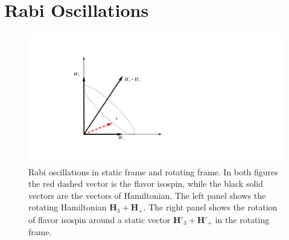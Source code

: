 \documentclass[%
reprint,
 amsmath,amssymb,
 aps,
]{revtex4-1}
\begin{document}

\section{\label{sec:rabi-oscillations}Rabi Oscillations}


\begin{figure}
        \centering
        \includegraphics[width=\columnwidth, trim={20cm 10cm 50cm 10cm},clip]{assets/rabi-isospin-rotating-frame}
    \caption{Rabi oscillations in static frame and rotating frame. In both figures the red dashed vector is the flavor isospin, while the black solid vectors are the vectors of Hamiltonian. The left panel shows the rotating Hamiltonian $\mathbf{H}_3+\mathbf{H}_+$. The right panel shows the rotation of flavor isospin around a static vector $\mathbf{H}'_3+\mathbf{H}'_+$ in the rotating frame.}
    \label{fig-rabi-isospin-rotating-frame}
\end{figure}
\end{document}
